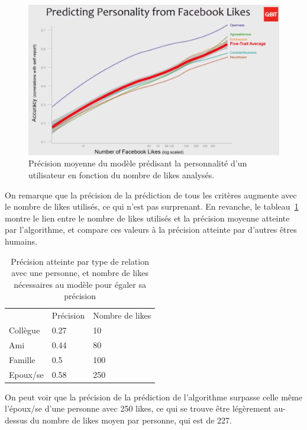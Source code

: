 		\begin{figure}[ht]
			\centering
			\includegraphics[width=1\textwidth]{images/analysis/talk1}
			\caption{Précision moyenne du modèle prédisant la personnalité d'un utilisateur en fonction du nombre de likes analysés\cite{kosinski-talk}.}
			\label{a-talk1}
		\end{figure}

		On remarque que la précision de la prédiction de tous les critères augmente avec le nombre de likes utilisés, ce qui n'est pas surprenant. En revanche, le tableau~\ref{a-talk-table1} montre le lien entre le nombre de likes utilisés et la précision moyenne atteinte par l'algorithme, et compare ces valeurs à la précision atteinte par d'autres êtres humains.

		\begin{table}[]
			\centering
			\begin{tabular}{lll}
				         & Précision & Nombre de likes \\
				Collègue & 0.27      & 10                            \\
				Ami      & 0.44      & 80                            \\
				Famille  & 0.5       & 100                           \\
				Epoux/se & 0.58      & 250                          
			\end{tabular}
			\caption{Précision atteinte par type de relation avec une personne, et nombre de likes nécessaires au modèle pour égaler sa précision}
			\label{a-talk-table1}
		\end{table}

		On peut voir que la précision de la prédiction de l'algorithme surpasse celle même l'époux/se d'une personne avec 250 likes, ce qui se trouve être légèrement au-dessus du nombre de likes moyen par personne, qui est de 227.

